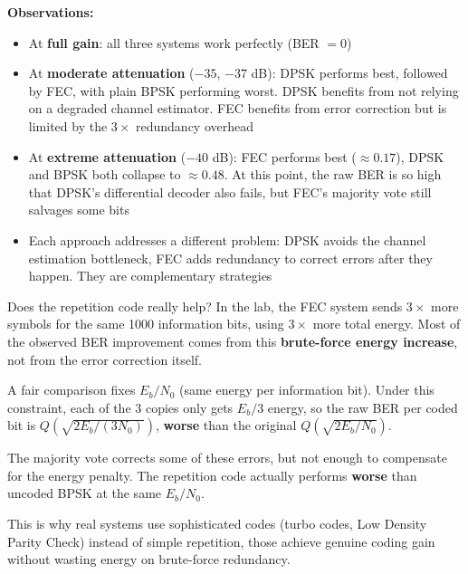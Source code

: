 \textbf{Observations:}

\begin{itemize}
\item At \textbf{full gain}: all three systems work perfectly (BER $= 0$)

\item At \textbf{moderate attenuation} ($-35$, $-37$ dB): DPSK performs best, followed by FEC, with plain BPSK performing worst. DPSK benefits from not relying on a degraded channel estimator. FEC benefits from error correction but is limited by the $3\times$ redundancy overhead

\item At \textbf{extreme attenuation} ($-40$ dB): FEC performs best ($\approx 0.17$), DPSK and BPSK both collapse to $\approx 0.48$. At this point, the raw BER is so high that DPSK's differential decoder also fails, but FEC's majority vote still salvages some bits

\item Each approach addresses a different problem: DPSK avoids the channel estimation bottleneck, FEC adds redundancy to correct errors after they happen. They are complementary strategies
\end{itemize}

\newpage

\begin{IntuitionBox}{Does the repetition code really help?}
In the lab, the FEC system sends $3\times$ more symbols for the same 1000 information bits, using $3\times$ more total energy. Most of the observed BER improvement comes from this \textbf{brute-force energy increase}, not from the error correction itself.

\vspace{0.5cm}

A fair comparison fixes $E_b/N_0$ (same energy per information bit). Under this constraint, each of the 3 copies only gets $E_b/3$ energy, so the raw BER per coded bit is $Q(\sqrt{2E_b/(3N_0)})$, \textbf{worse} than the original $Q(\sqrt{2E_b/N_0})$.

\vspace{1cm}

The majority vote corrects some of these errors, but not enough to compensate for the energy penalty. The repetition code actually performs \textbf{worse} than uncoded BPSK at the same $E_b/N_0$.

\vspace{0.5cm}

This is why real systems use sophisticated codes (turbo codes, Low Density Parity Check) instead of simple repetition,  those achieve genuine coding gain without wasting energy on brute-force redundancy.
\end{IntuitionBox}

